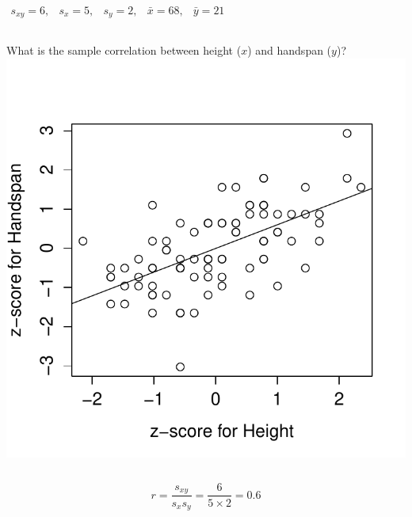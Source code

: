 \documentclass[handout]{beamer}
\begin{document}
\begin{frame}
$\begin{array}{ccccc} s_{xy} = 6,&s_x = 5,& s_y = 2,& \bar{x} = 68,& \bar{y} = 21\end{array}$
\begin{columns}[c]
\column{2.5in}
What is the sample correlation between height ($x$) and handspan ($y$)?
\column{1.8in}
\includegraphics[scale = 0.4]{./images/height_handspan_zline}
\end{columns}
\alert{$$r = \frac{s_{xy}}{s_x s_y} = \frac{6}{5\times 2} = 0.6$$}
\end{frame}
\end{document}
